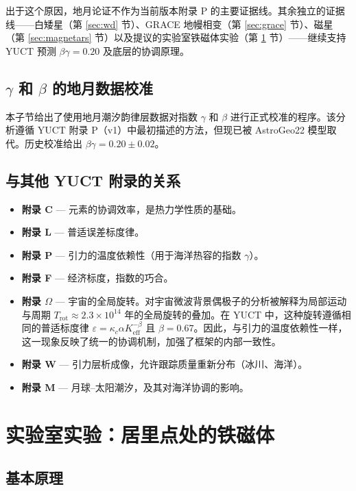\documentclass[12pt]{article}
\theoremstyle{remark}
\begin{document}
	出于这个原因，地月论证不作为当前版本附录 P 的主要证据线。其余独立的证据线——白矮星（第 \ref{sec:wd} 节）、GRACE 地幔相变（第 \ref{sec:grace} 节）、磁星（第 \ref{sec:magnetars} 节）以及提议的实验室铁磁体实验（第 \ref{sec:lab} 节）——继续支持 YUCT 预测 $\beta\gamma = 0.20$ 及底层的协调原理。
	
	\subsection{\(\gamma\) 和 \(\beta\) 的地月数据校准}\label{subsec:earth-moon-calibration}
	本子节给出了使用地月潮汐韵律层数据对指数 \(\gamma\) 和 \(\beta\) 进行正式校准的程序。该分析遵循 YUCT 附录 P（v1）中最初描述的方法，但现已被 AstroGeo22 模型取代。历史校准给出 \(\beta\gamma = 0.20 \pm 0.02\)。
	
	\subsection{与其他 YUCT 附录的关系}
	
	\begin{itemize}
		\item \textbf{附录 C} — 元素的协调效率，是热力学性质的基础。
		\item \textbf{附录 L} — 普适误差标度律。
		\item \textbf{附录 P} — 引力的温度依赖性（用于海洋热容的指数 $\gamma$）。
		\item \textbf{附录 F} — 经济标度，指数的巧合。
		\item \textbf{附录 \(\Omega\)} — 宇宙的全局旋转。对宇宙微波背景偶极子的分析被解释为局部运动与周期 $T_{\mathrm{rot}} \approx 2.3\times10^{14}$ 年的全局旋转的叠加。在 YUCT 中，这种旋转遵循相同的普适标度律 $\varepsilon = \kappa_c \alpha K_{\mathrm{eff}}^{-\beta}$ 且 $\beta = 0.67$。因此，与引力的温度依赖性一样，这一现象反映了统一的协调机制，加强了框架的内部一致性。
		\item \textbf{附录 W} — 引力层析成像，允许跟踪质量重新分布（冰川、海洋）。
		\item \textbf{附录 M} — 月球–太阳潮汐，及其对海洋协调的影响。
	\end{itemize}
	
	\section{实验室实验：居里点处的铁磁体}
	\label{sec:lab}
	
	\subsection{基本原理}
	\label{subsec:lab-rationale}
	
\end{document}
